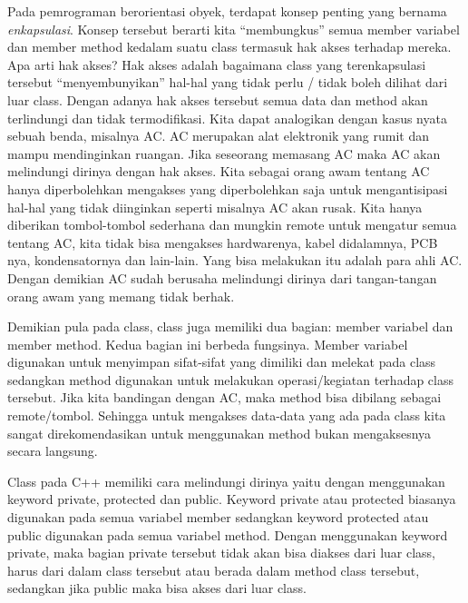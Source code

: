 Pada pemrograman berorientasi obyek, terdapat konsep penting yang
bernama \emph{enkapsulasi}. Konsep tersebut berarti kita ``membungkus''
semua member variabel dan member method kedalam suatu class termasuk hak
akses terhadap mereka. Apa arti hak akses? Hak akses adalah bagaimana
class yang terenkapsulasi tersebut ``menyembunyikan'' hal-hal yang tidak
perlu / tidak boleh dilihat dari luar class. Dengan adanya hak akses
tersebut semua data dan method akan terlindungi dan tidak termodifikasi.
Kita dapat analogikan dengan kasus nyata sebuah benda, misalnya AC. AC
merupakan alat elektronik yang rumit dan mampu mendinginkan ruangan.
Jika seseorang memasang AC maka AC akan melindungi dirinya dengan hak
akses. Kita sebagai orang awam tentang AC hanya diperbolehkan mengakses
yang diperbolehkan saja untuk mengantisipasi hal-hal yang tidak
diinginkan seperti misalnya AC akan rusak. Kita hanya diberikan
tombol-tombol sederhana dan mungkin remote untuk mengatur semua tentang
AC, kita tidak bisa mengakses hardwarenya, kabel didalamnya, PCB nya,
kondensatornya dan lain-lain. Yang bisa melakukan itu adalah para ahli
AC. Dengan demikian AC sudah berusaha melindungi dirinya dari
tangan-tangan orang awam yang memang tidak berhak.

Demikian pula pada class, class juga memiliki dua bagian: member
variabel dan member method. Kedua bagian ini berbeda fungsinya. Member
variabel digunakan untuk menyimpan sifat-sifat yang dimiliki dan melekat
pada class sedangkan method digunakan untuk melakukan operasi/kegiatan
terhadap class tersebut. Jika kita bandingan dengan AC, maka method bisa
dibilang sebagai remote/tombol. Sehingga untuk mengakses data-data yang
ada pada class kita sangat direkomendasikan untuk menggunakan method
bukan mengaksesnya secara langsung.

Class pada C++ memiliki cara melindungi dirinya yaitu dengan menggunakan
keyword private, protected dan public. Keyword private atau protected
biasanya digunakan pada semua variabel member sedangkan keyword
protected atau public digunakan pada semua variabel method. Dengan
menggunakan keyword private, maka bagian private tersebut tidak akan
bisa diakses dari luar class, harus dari dalam class tersebut atau
berada dalam method class tersebut, sedangkan jika public maka bisa
akses dari luar class.


